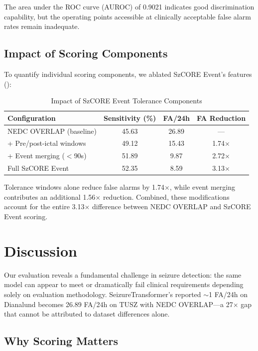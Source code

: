 \documentclass[10pt,a4paper]{article}
\begin{document}
The area under the ROC curve (AUROC) of 0.9021 indicates good discrimination capability, but the operating points accessible at clinically acceptable false alarm rates remain inadequate.

\subsection{Impact of Scoring Components}

To quantify individual scoring components, we ablated SzCORE Event's features ():

\begin{table}[h]
\centering
\caption{Impact of SzCORE Event Tolerance Components}
\label{tab:ablation}
\begin{tabular}{lccc}
\toprule
\textbf{Configuration} & \textbf{Sensitivity (\%)} & \textbf{FA/24h} & \textbf{FA Reduction} \\
\midrule
NEDC OVERLAP (baseline) & 45.63 & 26.89 & --- \\
+ Pre/post-ictal windows & 49.12 & 15.43 & 1.74$\times$ \\
+ Event merging ($<$90s) & 51.89 & 9.87 & 2.72$\times$ \\
Full SzCORE Event & 52.35 & 8.59 & 3.13$\times$ \\
\bottomrule
\end{tabular}
\end{table}

Tolerance windows alone reduce false alarms by 1.74$\times$, while event merging contributes an additional 1.56$\times$ reduction. Combined, these modifications account for the entire 3.13$\times$ difference between NEDC OVERLAP and SzCORE Event scoring.

\section{Discussion}

Our evaluation reveals a fundamental challenge in seizure detection: the same model can appear to meet or dramatically fail clinical requirements depending solely on evaluation methodology. SeizureTransformer's reported $\sim$1 FA/24h on Dianalund becomes 26.89 FA/24h on TUSZ with NEDC OVERLAP---a 27$\times$ gap that cannot be attributed to dataset differences alone.

\subsection{Why Scoring Matters}
\end{document}
